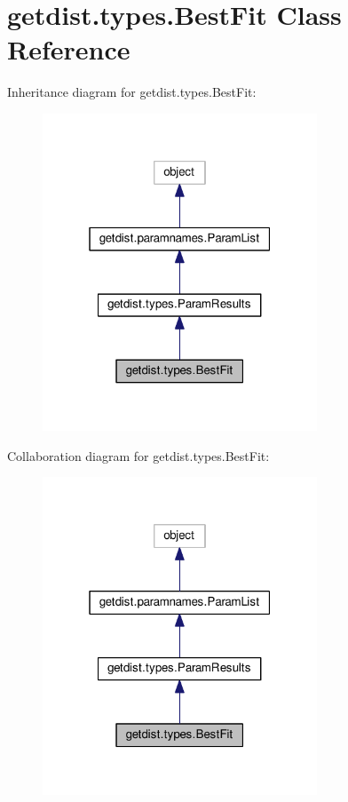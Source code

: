 \hypertarget{classgetdist_1_1types_1_1BestFit}{}\section{getdist.\+types.\+Best\+Fit Class Reference}
\label{classgetdist_1_1types_1_1BestFit}


Inheritance diagram for getdist.\+types.\+Best\+Fit\+:
\nopagebreak
\begin{figure}[H]
\begin{center}
\leavevmode
\includegraphics[width=232pt]{classgetdist_1_1types_1_1BestFit__inherit__graph}
\end{center}
\end{figure}


Collaboration diagram for getdist.\+types.\+Best\+Fit\+:
\nopagebreak
\begin{figure}[H]
\begin{center}
\leavevmode
\includegraphics[width=232pt]{classgetdist_1_1types_1_1BestFit__coll__graph}
\end{center}
\end{figure}
